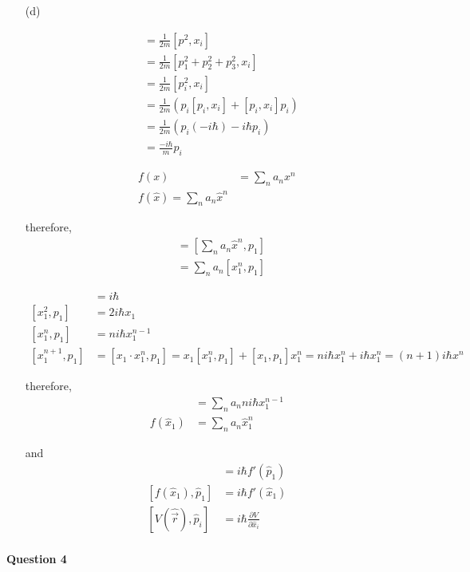\documentclass[11pt,a4paper]{article}
\begin{document}
\begin{enumerate}
\item[(d)]

\begin{align}
[\frac{p^2}{2m},x_i]&=\frac{1}{2m}[p^2,x_i]\\
&=\frac{1}{2m}[p_1^2+p_2^2+p_3^2,x_i]\\
&=\frac{1}{2m}[p_i^2,x_i]\\
&=\frac{1}{2m}(p_i[p_i,x_i]+[p_i,x_i]p_i)\\
&=\frac{1}{2m}(p_i(-i\hbar)-i\hbar p_i)\\
&=\frac{-i\hbar}{m}p_i
\end{align}

\begin{align}
f(x)&=\sum_n a_n x^n\\
f(\hat{x})=\sum_n a_n \hat{x}^n
\end{align}

therefore,
\begin{align}
[f(\hat{x}),p_1]&=[\sum_n a_n \hat{x}^n,p_1]\\
&=\sum_n a_n [x_1^n,p_1]
\end{align}

\begin{align}
[x_1,p_1]&=i\hbar\\
[x_1^2,p_1]&=2i\hbar x_1\\
[x_1^n,p_1]&=ni\hbar x_1^{n-1}\\
[x_1^{n+1},p_1]&=[x_1\cdot x_1^n,p_1]=x_1[x_1^n,p_1]+[x_1,p_1]x_1^n=ni\hbar x_1^n+i\hbar x_1^n=(n+1)i\hbar x^n
\end{align}

\newpage

therefore,
\begin{align}
&=\sum_n a_nni\hbar x_1^{n-1}\\
f(\hat{x}_1)&=\sum_n a_n\hat{x}_1^n
\end{align}

and
\begin{align}
[\hat{x}_1,f(\hat{x}_1)]&=i\hbar f'(\hat{p}_1)\\
[f(\hat{x}_1),\hat{p}_1]&=i\hbar f'(\hat{x}_1)\\
[V(\hat{\vec{r}}),\hat{p}_i]&=i\hbar\frac{\partial V}{\partial \hat{x}_i}
\end{align}

\end{enumerate}

\newpage

\paragraph{Question 4}
\end{document}
